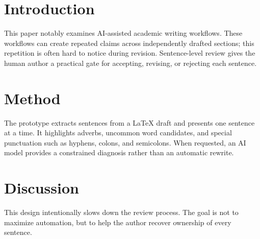 \section{Introduction}

This paper notably examines AI-assisted academic writing workflows.
These workflows can create repeated claims across independently drafted sections; this repetition is often hard to notice during revision.
Sentence-level review gives the human author a practical gate for accepting, revising, or rejecting each sentence.

\section{Method}

The prototype extracts sentences from a LaTeX draft and presents one sentence at a time.
It highlights adverbs, uncommon word candidates, and special punctuation such as hyphens, colons, and semicolons.
When requested, an AI model provides a constrained diagnosis rather than an automatic rewrite.

\section{Discussion}

This design intentionally slows down the review process.
The goal is not to maximize automation, but to help the author recover ownership of every sentence.
